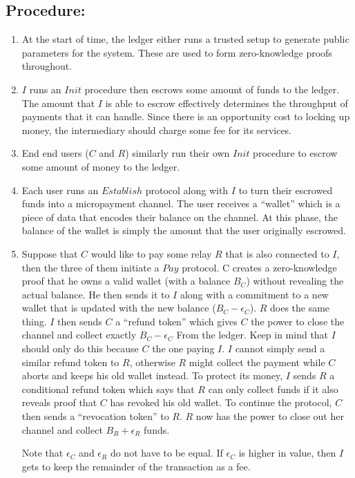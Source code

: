 \documentclass{article}
\begin{document}
\subsection{Procedure:}
\begin{enumerate}
\item At the start of time, the ledger either runs a trusted setup to generate public parameters for the system. These are used to form zero-knowledge proofs throughout.
\item $I$ runs an $Init$ procedure then escrows some amount of funds to the ledger. The amount that $I$ is able to escrow effectively determines the throughput of payments that it can handle. Since there is an opportunity cost to locking up money, the intermediary should charge some fee for its services.
\item End end users ($C$ and $R$) similarly run their own $Init$ procedure to escrow some amount of money to the ledger.
\item Each user runs an $Establish$ protocol along with $I$ to turn their escrowed funds into a micropayment channel. The user receives a ``wallet'' which is a piece of data that encodes their balance on the channel. At this phase, the balance of the wallet is simply the amount that the user originally escrowed.
\item Suppose that $C$ would like to pay some relay $R$ that is also connected to $I$, then the three of them initiate a $Pay$ protocol. C creates a zero-knowledge proof that he owns a valid wallet (with a balance $B_C$) without revealing the actual balance. He then sends it to $I$ along with a commitment to a new wallet that is updated with the new balance ($B_C - \epsilon_C$). $R$ does the same thing. $I$ then sends $C$ a ``refund token'' which gives $C$ the power to close the channel and collect exactly $B_C - \epsilon_C$ From the ledger. Keep in mind that $I$ should only do this because $C$ the one paying $I$. $I$ cannot simply send a similar refund token to $R$, otherwise $R$ might collect the payment while $C$ aborts and keeps his old wallet instead. To protect its money, $I$ sends $R$ a conditional refund token which says that $R$ can only collect funds if it also reveals proof that $C$ has revoked his old wallet. To continue the protocol, $C$ then sends a ``revocation token'' to $R$. $R$ now has the power to close out her channel and collect $B_R + \epsilon_R$ funds.

Note that $\epsilon_C$ and $\epsilon_R$ do not have to be equal. If $\epsilon_C$ is higher in value, then $I$ gets to keep the remainder of the transaction as a fee.


\end{enumerate}
\end{document}
